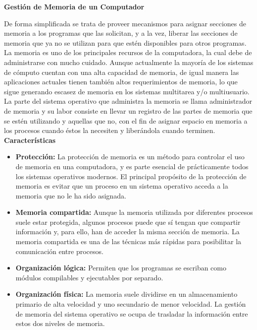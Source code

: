 \documentclass[10pt,letterpaper]{article}
\begin{document}
\begin{justify}
	
	\begin{center}
		\textbf{Gestión de Memoria de un Computador}
	\end{center}
	
	\noindent
	De forma simplificada se trata de proveer mecanismos para asignar secciones de memoria a los programas que las solicitan, y a la vez, liberar las secciones de memoria que ya no se utilizan para que estén disponibles para otros programas.\cite{septima}\\
	
	\noindent
	La memoria es uno de los principales recursos de la computadora, la cual debe de administrarse con mucho cuidado. Aunque actualmente la mayoría de los sistemas de cómputo cuentan con una alta capacidad de memoria, de igual manera las aplicaciones actuales tienen también altos requerimientos de memoria, lo que sigue generando escasez de memoria en los sistemas multitarea y/o multiusuario. \\
	
	\noindent
	La parte del sistema operativo que administra la memoria se llama administrador de memoria y su labor consiste en llevar un registro de las partes de memoria que se estén utilizando y aquellas que no, con el fin de asignar espacio en memoria a los procesos cuando éstos la necesiten y liberándola cuando terminen.\\
	
	\noindent
	\textbf{Características} \\
	
	\begin{itemize}
		\item \textbf{Protección:} La protección de memoria es un método para controlar el uso de memoria en una computadora, y es parte esencial de prácticamente todos los sistemas operativos modernos. El principal propósito de la protección de memoria es evitar que un proceso en un sistema operativo acceda a la memoria que no le ha sido asignada.
		
		\item \textbf{ Memoria compartida:} Aunque la memoria utilizada por diferentes procesos suele estar protegida, algunos procesos puede que sí tengan que compartir información y, para ello, han de acceder la misma sección de memoria. La memoria compartida es una de las técnicas más rápidas para posibilitar la comunicación entre procesos.
		
		\item \textbf{Organización lógica:} Permiten que los programas se escriban como módulos compilables y ejecutables por separado.
		
		\item \textbf{Organización física:} La memoria suele dividirse en un almacenamiento primario de alta velocidad y uno secundario de menor velocidad.  La gestión de memoria del sistema operativo se ocupa de trasladar la información entre estos dos niveles de memoria.
	\end{itemize}
		
\end{justify}
\end{document}
